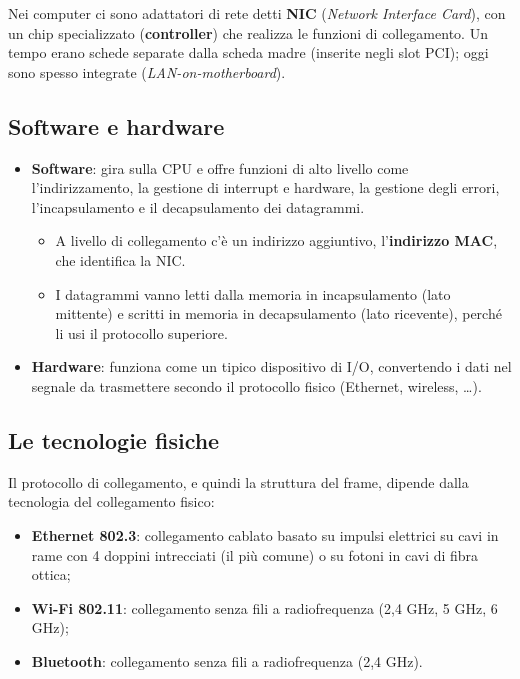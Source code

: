 Nei computer ci sono adattatori di rete detti \textbf{NIC} (\emph{Network Interface Card}), con un chip specializzato
(\textbf{controller}) che realizza le funzioni di collegamento. Un tempo erano schede separate dalla scheda madre (inserite negli slot
PCI); oggi sono spesso integrate (\emph{LAN-on-motherboard}).

\subsection{Software e hardware}

\begin{itemize}
    \item \textbf{Software}: gira sulla CPU e offre funzioni di alto livello come l'indirizzamento, la gestione di interrupt e
          hardware, la gestione degli errori, l'incapsulamento e il decapsulamento dei datagrammi.
    \begin{itemize}
      \item A livello di collegamento c'è un indirizzo aggiuntivo, l'\textbf{indirizzo MAC}, che identifica la NIC.
      \item I datagrammi vanno letti dalla memoria in incapsulamento (lato mittente) e scritti in memoria in decapsulamento (lato
            ricevente), perché li usi il protocollo superiore.
    \end{itemize}
    \item \textbf{Hardware}: funziona come un tipico dispositivo di I/O, convertendo i dati nel segnale da trasmettere secondo il
          protocollo fisico (Ethernet, wireless, \dots).
\end{itemize}

\subsection{Le tecnologie fisiche}

Il protocollo di collegamento, e quindi la struttura del frame, dipende dalla tecnologia del collegamento fisico:

\begin{itemize}
    \item \textbf{Ethernet 802.3}: collegamento cablato basato su impulsi elettrici su cavi in rame con 4 doppini intrecciati (il più
          comune) o su fotoni in cavi di fibra ottica;
    \item \textbf{Wi-Fi 802.11}: collegamento senza fili a radiofrequenza (2,4 GHz, 5 GHz, 6 GHz);
    \item \textbf{Bluetooth}: collegamento senza fili a radiofrequenza (2,4 GHz).
\end{itemize}

